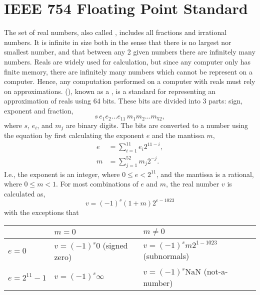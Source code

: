 \documentclass[fsharpnotes.tex]{subfiles}
\begin{document}
\section{IEEE 754 Floating Point Standard}
\label{sec:floatingPoint}
The set of real numbers, also called , includes all fractions and irrational numbers. It is infinite in size both in the sense that there is no largest nor smallest number, and that between any 2 given numbers there are infinitely many numbers. Reals are widely used for calculation, but since any computer only has finite memory, there are infinitely many numbers which cannot be represent on a computer. Hence, any computation performed on a computer with reals must rely on approximations.  (), known as a , is a standard for representing an approximation of reals using 64 bits. These bits are divided into 3 parts: sign, exponent and fraction, 
\begin{displaymath}
  s\, e_1 e_2 \ldots e_{11}\, m_1 m_2 \ldots m_{52},
\end{displaymath}
where $s$, $e_i$, and $m_j$ are binary digits. The bits are converted to a number using the equation by first calculating the exponent $e$ and the mantissa $m$,
\begin{align}
  e &= \sum _{i=1}^{11}e_i2^{11-i},\\
  m & = \sum _{j=1}^{52}m_j2^{-j}.
\end{align}
I.e., the exponent is an integer, where $0 \leq e < 2^{11}$, and the mantissa is a rational, where $0 \leq m < 1$. For most combinations of $e$ and $m$, the real number $v$ is calculated as,
\begin{equation}
  v = \left(-1\right)^{s} \left(1+m\right) 2^{e-1023}
\end{equation}
 with the exceptions that
\begin{center}
  \begin{tabular}{|l|l|l|}
    \hline
    \rowcolor{headerRowColor}& $m=0$                                   & $m\neq 0$\\
    \hline
    $e=0$           & $v = \left(-1\right)^{s} 0$ (signed zero) & $v = \left(-1\right)^{s} m 2^{1-1023}$ (subnormals)\\
    \hline 
    $e=2^{11}-1$ & $v = \left(-1\right)^{s} \infty$               & $v = \left(-1\right)^{s} \text{NaN}$ (not-a-number)\\
    \hline
  \end{tabular}
\end{center}
\end{document}
